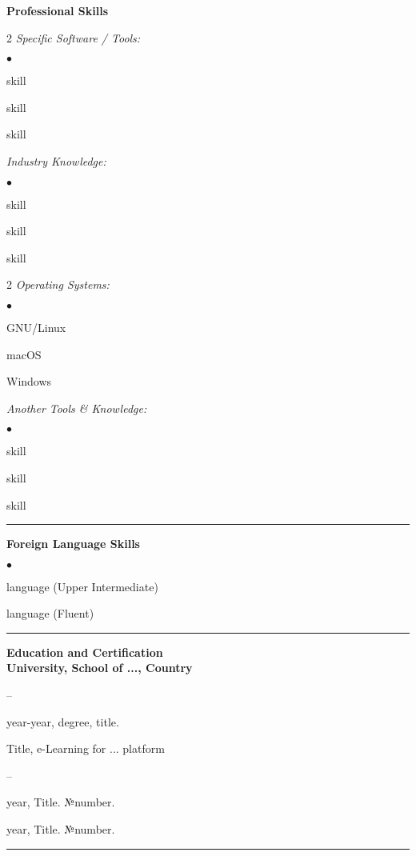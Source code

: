 \documentclass[oneside,final,10pt]{extreport}
\newenvironment{compactlist}{
	\begin{list}{{$\bullet$}}{
		\setlength\leftmargin{0.4cm}
		\setlength\partopsep{0pt}
		\setlength\parskip{0pt}
		\setlength\parsep{0pt}
		\setlength\topsep{0pt}
		\setlength\itemsep{0pt}
	}
}{
	\end{list}
}
\newenvironment{innerlist}{
	\begin{list}{--}{
		\setlength\leftmargin{0.8cm}
		\setlength\partopsep{0pt}
		\setlength\parskip{0pt}
		\setlength\parsep{0pt}
		\setlength\topsep{0pt}
		\setlength\itemsep{0pt}
	}
}{
	\end{list}
}
\begin{document}
\bfseries
Professional Skills %
\mdseries
	\begin{multicols}{2}
		\textsl{Specific Software / Tools:}
			\begin{compactlist}
				\item skill
				\item skill
				\item skill
			\end{compactlist}
		\textsl{Industry Knowledge:}
			\begin{compactlist}
				\item skill
				\item skill
				\item skill
			\end{compactlist}
	\end{multicols}

	\begin{multicols}{2}
		\textsl{Operating Systems:}
			\begin{compactlist}
				\item GNU/Linux
				\item macOS
				\item Windows
			\end{compactlist}
		\textsl{Another Tools \& Knowledge:}
			\begin{compactlist}
				\item skill
				\item skill
				\item skill
			\end{compactlist}
	\end{multicols}
\rule{\textwidth}{0.4pt}

\bfseries
Foreign Language Skills
\mdseries
	\begin{compactlist}
		\item language (Upper Intermediate)
		\item language (Fluent)
	\end{compactlist}
\rule{\textwidth}{0.4pt}

\bfseries
Education and Certification
\mdseries \\[3pt]	
University, School of ..., Country  	
	\begin{innerlist}	
		\item year-year, degree, title. 
	\end{innerlist}	
Title, e-Learning for ... platform 
	\begin{innerlist}	
		\item year, Title. №number.
		\item year, Title. №number.
	\end{innerlist}	 
\rule{\textwidth}{0.4pt}
\end{document}
